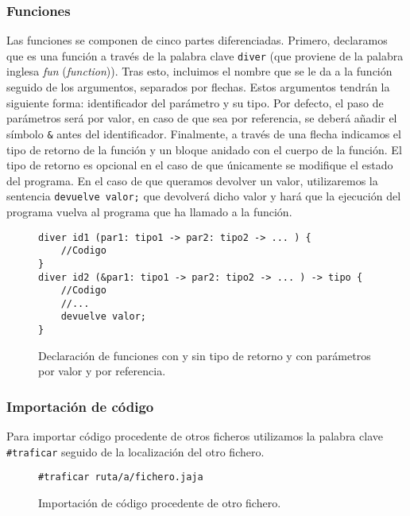 \subsubsection{Funciones}
Las funciones se componen de cinco partes diferenciadas. Primero, declaramos que
es una función a través de la palabra clave \lstinline{diver} (que proviene de la palabra
inglesa \textit{fun} (\textit{function})). Tras esto, incluimos el nombre que se
le da a la función seguido de los argumentos, separados por flechas. Estos
argumentos tendrán la siguiente forma: identificador del parámetro y su tipo.
Por defecto, el paso de parámetros será por valor, en caso de que sea por
referencia, se deberá añadir el símbolo \lstinline{&} antes del identificador.
Finalmente, a través de una flecha indicamos el tipo de retorno de la función y
un bloque anidado con el cuerpo de la función. El tipo de retorno es opcional en
el caso de que únicamente se modifique el estado del programa. En el caso de que
queramos devolver un valor, utilizaremos la sentencia \lstinline{devuelve valor;}
que devolverá dicho valor y hará que la ejecución del programa vuelva al
programa que ha llamado a la función.
\begin{figure}[htbp]
    \centering
    \begin{lstlisting}
diver id1 (par1: tipo1 -> par2: tipo2 -> ... ) {
    //Codigo
}
diver id2 (&par1: tipo1 -> par2: tipo2 -> ... ) -> tipo {
    //Codigo
    //...
    devuelve valor;
}
    \end{lstlisting}
    \caption{Declaración de funciones con y sin tipo de retorno y con parámetros
    por valor y por referencia.}
\end{figure}

\subsubsection{Importación de código}
Para importar código procedente de otros ficheros utilizamos la palabra clave
\lstinline{#traficar} seguido de la localización del otro fichero.
\begin{figure}[htbp]
    \centering
    \begin{lstlisting}
#traficar ruta/a/fichero.jaja
    \end{lstlisting}
    \caption{Importación de código procedente de otro fichero.}
\end{figure}

